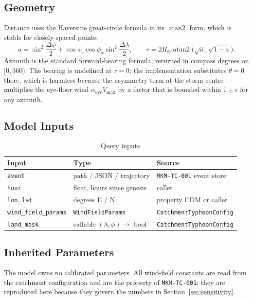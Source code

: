 \documentclass[11pt,a4paper]{article}
\begin{document}
\subsection{Geometry}
Distance uses the Haversine great-circle formula in its $\operatorname{atan2}$
form, which is stable for closely-spaced points:
\[
  a = \sin^2\!\frac{\Delta\phi}{2}
      + \cos\phi_c \cos\phi_x \sin^2\!\frac{\Delta\lambda}{2},
  \qquad
  r = 2R_\oplus \operatorname{atan2}\bigl(\sqrt{a}, \sqrt{1-a}\bigr).
\]
Azimuth is the standard forward-bearing formula, returned in compass degrees on
$[0, 360)$. The bearing is undefined at $r = 0$; the implementation substitutes
$\theta = 0$ there, which is harmless because the asymmetry term at the storm
centre multiplies the eye-floor wind $\alpha_{\text{eye}} V_{\max}$ by a factor
that is bounded within $1 \pm \epsilon$ for any azimuth.

\mkminputs

\subsection{Model Inputs}

\begin{table}[H]
  \centering
  \caption{Query inputs}
  \begin{tabular}{lll}
    \toprule
    \textbf{Input} & \textbf{Type} & \textbf{Source} \\
    \midrule
    \texttt{event}   & path / JSON / trajectory & \texttt{MKM-TC-001} event store \\
    \texttt{hour}    & float, hours since genesis & caller \\
    \texttt{lon}, \texttt{lat} & degrees E / N & property CDM or caller \\
    \texttt{wind\_field\_params} & \texttt{WindFieldParams} & \texttt{CatchmentTyphoonConfig} \\
    \texttt{land\_mask} & callable $(\lambda,\phi) \to$ bool & \texttt{CatchmentTyphoonConfig} \\
    \bottomrule
  \end{tabular}
\end{table}

\subsection{Inherited Parameters}
The model owns no calibrated parameters. All wind-field constants are read from
the catchment configuration and are the property of \texttt{MKM-TC-001}; they
are reproduced here because they govern the numbers in
Section~\ref{sec:sensitivity}.
\end{document}
